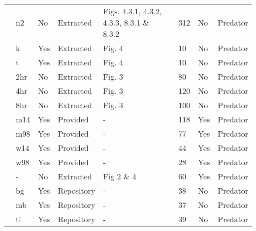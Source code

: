 \begin{longtable}{lllllllll}
\citet{Uttley:1980aa}&n2&No&Extracted&Figs. 4.3.1, 4.3.2, 4.3.3, 8.3.1 \& 8.3.2&\citet{Novak:2020aa}&312&No&Predator\tabularnewline
\citet{Vahl:2005aa}&k&Yes&Extracted&Fig. 4&\citet{Novak:2020aa}&10&No&Predator\tabularnewline
\citet{Vahl:2005aa}&t&Yes&Extracted&Fig. 4&\citet{Novak:2020aa}&10&No&Predator\tabularnewline
\citet{Von-Westernhagen:1976aa}&2hr&No&Extracted&Fig. 3&\citet{Novak:2020aa}&80&No&Predator\tabularnewline
\citet{Von-Westernhagen:1976aa}&4hr&No&Extracted&Fig. 3&\citet{Novak:2020aa}&120&No&Predator\tabularnewline
\citet{Von-Westernhagen:1976aa}&8hr&No&Extracted&Fig. 3&\citet{Novak:2020aa}&100&No&Predator\tabularnewline
\citet{Vucetich:2002aa}&m14&Yes&Provided&-&&118&Yes&Predator\tabularnewline
\citet{Vucetich:2002aa}&m98&Yes&Provided&-&&77&Yes&Predator\tabularnewline
\citet{Vucetich:2002aa}&w14&Yes&Provided&-&&44&Yes&Predator\tabularnewline
\citet{Vucetich:2002aa}&w98&Yes&Provided&-&&28&Yes&Predator\tabularnewline
\citet{Walde:1984aa}&-&No&Extracted&Fig 2 \& 4&\citet{Novak:2020aa}&60&Yes&Predator\tabularnewline
\citet{Wasserman:2016aa}&bg&Yes&Repository&-&\citet{Wasserman:2016ab}&38&No&Predator\tabularnewline
\citet{Wasserman:2016aa}&mb&Yes&Repository&-&\citet{Wasserman:2016ab}&37&No&Predator\tabularnewline
\citet{Wasserman:2016aa}&ti&Yes&Repository&-&\citet{Wasserman:2016ab}&39&No&Predator\tabularnewline
\hline
\end{longtable}
